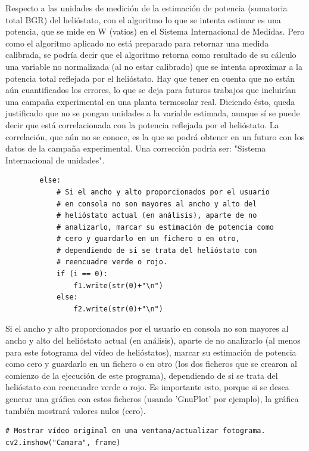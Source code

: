 Respecto a las unidades de medición de la estimación de potencia (sumatoria total BGR) del helióstato, con el algoritmo lo que se intenta estimar es una potencia, que se mide en W (vatios) en el Sistema Internacional de Medidas. Pero como el algoritmo aplicado no está preparado para retornar una medida calibrada, se podría decir que el algoritmo retorna como resultado de su cálculo una variable no normalizada (al no estar calibrado) que se intenta aproximar a la potencia total reflejada por el helióstato. Hay que tener en cuenta que no están aún cuantificados los errores, lo que se deja para futuros trabajos que incluirían una campaña experimental en una planta termosolar real. Diciendo ésto, queda justificado que no se pongan unidades a la variable estimada, aunque sí se puede decir que está correlacionada con la potencia reflejada por el helióstato. La correlación, que aún no se conoce, es la que se podrá obtener en un futuro con los datos de la campaña experimental. Una corrección podría ser: "Sistema Internacional de unidades".\\[20pt]

\begin{lstlisting}
		else:
            # Si el ancho y alto proporcionados por el usuario
            # en consola no son mayores al ancho y alto del
            # helióstato actual (en análisis), aparte de no
            # analizarlo, marcar su estimación de potencia como
            # cero y guardarlo en un fichero o en otro,
            # dependiendo de si se trata del helióstato con
            # reencuadre verde o rojo.
            if (i == 0):
                f1.write(str(0)+"\n")
            else:
                f2.write(str(0)+"\n")
\end{lstlisting}
                
Si el ancho y alto proporcionados por el usuario en consola no son mayores al ancho y alto del helióstato actual (en análisis), aparte de no analizarlo (al menos para este fotograma del vídeo de helióstatos), marcar su estimación de potencia como cero y guardarlo en un fichero o en otro (los dos ficheros que se crearon al comienzo de la ejecución de este programa), dependiendo de si se trata del helióstato con reencuadre verde o rojo. Es importante esto, porque si se desea generar una gráfica con estos ficheros (usando 'GnuPlot' por ejemplo), la gráfica también mostrará valores nulos (cero).\\[20pt]

\begin{lstlisting}
# Mostrar vídeo original en una ventana/actualizar fotograma.
cv2.imshow("Camara", frame)
\end{lstlisting}

